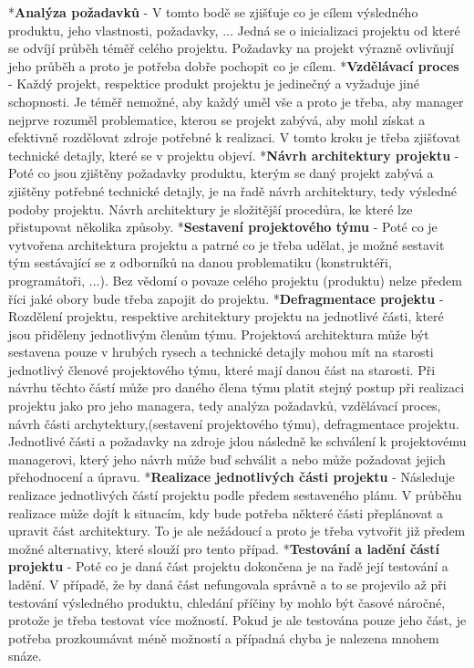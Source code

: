 \begitems
*{\bf Analýza požadavků} - V tomto bodě se zjišťuje co je cílem výsledného produktu, jeho vlastnosti, požadavky, ... Jedná se o inicializaci projektu od které se odvíjí průběh téměř celého projektu. Požadavky na projekt výrazně ovlivňují jeho průběh a proto je potřeba dobře pochopit co je cílem. 
*{\bf Vzdělávací proces} -  Každý projekt, respektice produkt projektu je jedinečný a vyžaduje jiné schopnosti. Je téměř nemožné, aby každý uměl vše a proto je třeba, aby manager nejprve rozuměl problematice, kterou se projekt zabývá, aby mohl získat a efektivně rozdělovat zdroje potřebné k realizaci. V tomto kroku je třeba zjišťovat technické detajly, které se v projektu objeví.
*{\bf Návrh architektury projektu} - Poté co jsou zjištěny požadavky produktu, kterým se daný projekt zabývá a zjištěny potřebné technické detajly, je na řadě návrh architektury, tedy výsledné podoby projektu. Návrh architektury je složitější procedůra, ke které lze přistupovat několika způsoby.
*{\bf Sestavení projektového týmu} - Poté co je vytvořena architektura projektu a patrné co je třeba udělat, je možné sestavit tým sestávající se z odborníků na danou problematiku (konstruktéři, programátoři, ...). Bez vědomí o povaze celého projektu (produktu) nelze předem říci jaké obory bude třeba zapojit do projektu. 
*{\bf Defragmentace projektu} - Rozdělení projektu, respektive architektury projektu na jednotlivé části, které jsou přiděleny jednotlivým členům týmu. Projektová architektura může být sestavena pouze v hrubých rysech a technické detajly mohou mít na starosti jednotlivý členové projektového týmu, které mají danou část na starosti. Při návrhu těchto částí může pro daného člena týmu platit stejný postup při realizaci projektu jako pro jeho managera, tedy analýza požadavků, vzdělávací proces, návrh části archytektury,(sestavení projektového týmu), defragmentace projektu. Jednotlivé části a požadavky na zdroje jdou následně ke schválení k projektovému managerovi, který jeho návrh může buď schválit a nebo může požadovat jejich přehodnocení a úpravu. 
*{\bf Realizace jednotlivých části projektu} - Následuje realizace jednotlivých částí projektu podle předem sestaveného plánu. V průběhu realizace může dojít k situacím, kdy bude potřeba některé části přeplánovat a upravit část architektury. To je ale nežádoucí a proto je třeba vytvořit již předem možné alternativy, které slouží pro tento případ.
*{\bf Testování a ladění částí projektu} - Poté co je daná část projektu dokončena je na řadě její testování a ladění. V případě, že by daná část nefungovala správně a to se projevilo až při testování výsledného produktu, chledání příčiny by mohlo být časové náročné, protože je třeba testovat více možností. Pokud je ale testována pouze jeho část, je potřeba prozkoumávat méně možností a případná chyba je nalezena mnohem snáze.

